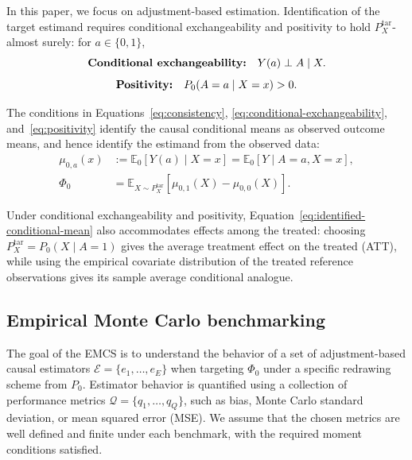 In this paper, we focus on adjustment-based estimation. Identification of the target estimand requires conditional exchangeability and positivity to hold \(P_X^{\mathrm{tar}}\)-almost surely: for \(a\in\{0,1\}\),
\begin{equation}
\text{\textbf{Conditional exchangeability:}}\quad Y(a)\perp A\mid X.
\label{eq:conditional-exchangeability}
\end{equation}
\begin{equation}
\text{\textbf{Positivity:}}\quad P_0(A=a\mid X=x)>0.
\label{eq:positivity}
\end{equation}

The conditions in Equations~\eqref{eq:consistency}, \eqref{eq:conditional-exchangeability}, and~\eqref{eq:positivity} identify the causal conditional means as observed outcome means, and hence identify the estimand from the observed data:
\begin{equation}
\begin{aligned}
\mu_{0,a}(x)
&:=
\mathbb E_0[Y(a)\mid X=x]
=
\mathbb E_0[Y\mid A=a,X=x],\\
\Phi_0
&=
\mathbb E_{X\sim P_X^{\mathrm{tar}}}
\left[\mu_{0,1}(X)-\mu_{0,0}(X)\right].
\end{aligned}
\label{eq:identified-conditional-mean}
\end{equation}

Under conditional exchangeability and positivity, Equation~\eqref{eq:identified-conditional-mean} also accommodates effects among the treated: choosing \(P_X^{\mathrm{tar}}=P_0(X\mid A=1)\) gives the average treatment effect on the treated (ATT), while using the empirical covariate distribution of the treated reference observations gives its sample average conditional analogue.

\subsection{Empirical Monte Carlo benchmarking}
\label{sec:emcs-framework}

The goal of the EMCS is to understand the behavior of a set of adjustment-based causal estimators \(\mathcal E=\{e_1,\dots,e_E\}\) when targeting \(\Phi_0\) under a specific redrawing scheme from \(P_0\). Estimator behavior is quantified using a collection of performance metrics \(\mathcal Q=\{q_1,\dots,q_Q\}\), such as bias, Monte Carlo standard deviation, or mean squared error (MSE). We assume that the chosen metrics are well defined and finite under each benchmark, with the required moment conditions satisfied.

